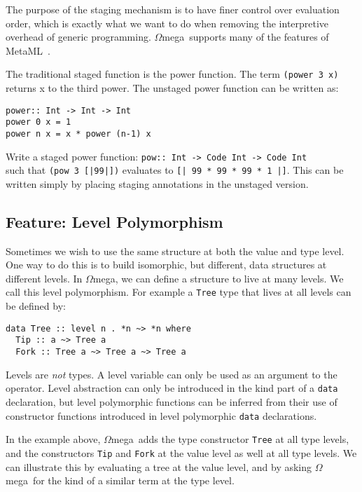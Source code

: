 \documentclass[11pt,twoside,A4]{llncs}
\newcommand{\om}{\emph{$\Omega$}mega}
\begin{document}
The purpose of the staging mechanism is to have finer control over
evaluation order, which is exactly what
we want to do when removing the interpretive overhead of generic programming. \om\ supports many of the features of
MetaML~\cite{Sheard:1999:UMS,TS00}. 

\begin{exercise}
The traditional staged function is the power function.
The term {\tt (power 3 x)} returns x to the third power. The unstaged
power function can be written as:
{\small 
\begin{verbatim}
power:: Int -> Int -> Int
power 0 x = 1
power n x = x * power (n-1) x
\end{verbatim}}
\noindent
Write a staged power function: {\tt pow:: Int -> Code Int -> Code Int}\\
such that {\tt (pow 3 [|99|])} evaluates to \verb+[| 99 * 99 * 99 * 1 |]+.
This can be written simply by placing staging annotations in the unstaged version.
\end{exercise}


\subsection{Feature: Level Polymorphism} \label{level}
Sometimes we wish to use the same structure at both the value and type level.
One way to do this is to build isomorphic, but different, data structures
at different levels. In \om, we can define a structure to live
at many levels. We call this level polymorphism. For example
a {\tt Tree} type that lives at all levels can be defined by:

{\small
\begin{verbatim}
data Tree :: level n . *n ~> *n where
  Tip :: a ~> Tree a
  Fork :: Tree a ~> Tree a ~> Tree a
\end{verbatim}}
\noindent
Levels are {\it not} types. A level variable can only be used
as an argument to the {\tt *} operator. Level abstraction can only
be introduced in the kind part of a {\tt data} declaration, but level polymorphic
functions can be inferred from their use of constructor functions
introduced in level polymorphic {\tt data} declarations.

In the example above,
\om\ adds the type constructor {\tt Tree} at all type levels,
and the constructors {\tt Tip} and {\tt Fork} at the value level
as well at all type levels. We can illustrate this by evaluating
a tree at the value level, and by asking \om\ for the kind of
a similar term at the type level.
\end{document}
